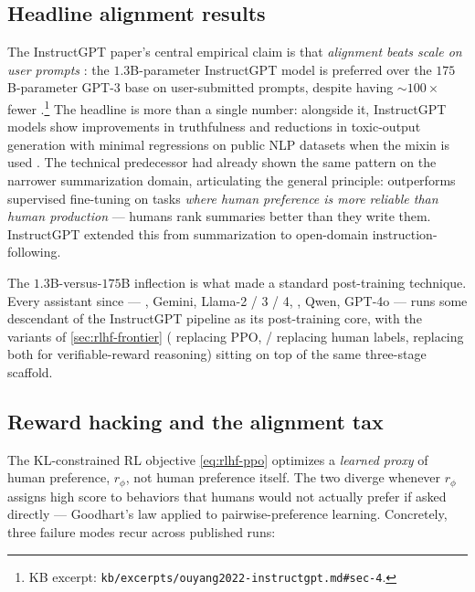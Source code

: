 \subsection{Headline alignment results}
\label{sec:rlhf-headline}

The InstructGPT paper's central empirical claim is that
\emph{alignment beats scale on user prompts}
\citep[\S 4]{ouyang2022-instructgpt}: the $1.3$B-parameter
InstructGPT model is preferred over the $175$B-parameter GPT-3 base
on user-submitted prompts, despite having $\sim\!100\times$ fewer
.\footnote{KB excerpt:
\nolinkurl{kb/excerpts/ouyang2022-instructgpt.md#sec-4}.} The headline
is more than a single number: alongside it, InstructGPT models show
improvements in truthfulness and reductions in toxic-output generation
with minimal regressions on public NLP datasets when the 
mixin is used \citep[\S 4]{ouyang2022-instructgpt}. The technical
predecessor \citep{stiennon2020-summarize} had already shown the same
pattern on the narrower summarization domain, articulating the general
principle:  outperforms supervised fine-tuning on tasks
\emph{where human preference is more reliable than human production} —
humans rank summaries better than they write them. InstructGPT
extended this from summarization to open-domain instruction-following.

The $1.3$B-versus-$175$B inflection is what made  a standard
post-training technique. Every assistant  since — , Gemini,
Llama-2 / 3 / 4, , Qwen, GPT-4o — runs some descendant of the
InstructGPT pipeline as its post-training core, with the variants of
\cref{sec:rlhf-frontier} ( replacing PPO,  /  replacing
human labels,  replacing both for verifiable-reward reasoning)
sitting on top of the same three-stage scaffold.

\subsection{Reward hacking and the alignment tax}
\label{sec:rlhf-hacking}

The KL-constrained RL objective \cref{eq:rlhf-ppo} optimizes a
\emph{learned proxy} of human preference, $r_\phi$, not human
preference itself. The two diverge whenever $r_\phi$ assigns high
score to behaviors that humans would not actually prefer if asked
directly — Goodhart's law applied to pairwise-preference learning.
Concretely, three failure modes recur across published  runs:

